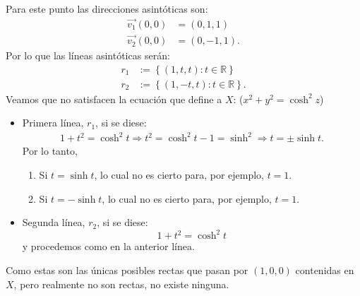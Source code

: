 Para este punto las direcciones asintóticas son:
\begin{align*}
    \overrightarrow{v_1}\left( 0, 0 \right) &= \left( 0, 1, 1 \right) \\
    \overrightarrow{v_2}\left( 0, 0 \right) &= \left( 0, -1, 1 \right).
\end{align*}
Por lo que las líneas asintóticas serán:
\begin{align*}
    r_1 &:= \left\{ \left( 1, t, t \right) : t \in \mathbb{R} \right\}\\
    r_2 &:= \left\{ \left( 1, -t, t \right) : t \in \mathbb{R} \right\}.
\end{align*}
Veamos que no satisfacen la ecuación que define a $X$: ($x^2 + y^2 = \cosh^2 z$)
\begin{itemize}
    \item Primera línea, $r_1$, si se diese:
        \begin{align*}
            1 + t^2 = \cosh^2 t \Rightarrow t^2 = \cosh^2 t - 1 = \sinh^2 \Rightarrow t
            = \pm \sinh t.
        \end{align*}
        Por lo tanto,
        \begin{enumerate}
            \item Si $t = \sinh t$, lo cual no es cierto para, por ejemplo, $t =
                1$.
            \item Si $t = -\sinh t$, lo cual no es cierto para, por ejemplo, $t
                = 1$.
        \end{enumerate}
    \item Segunda línea, $r_2$, si se diese:
    \[
    1 + t^2 = \cosh^2 t
    \]
    y procedemos como en la anterior línea.
\end{itemize}
Como estas son las únicas posibles rectas que pasan por $\left( 1, 0, 0 \right)$
contenidas en $X$, pero realmente no son rectas, no existe ninguna.
